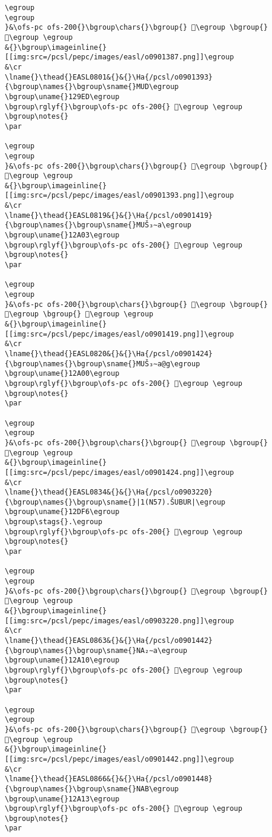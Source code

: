 \begin{verbatim}
\egroup
\egroup
}&\ofs-pc ofs-200{}\bgroup\chars{}\bgroup{} 𒧨\egroup \bgroup{} 𒧩\egroup \egroup
&{}\bgroup\imageinline{}[[img:src=/pcsl/pepc/images/easl/o0901387.png]]\egroup
&\cr
\lname{}\thead{}EASL0801&{}&{}\Ha{/pcsl/o0901393}{\bgroup\names{}\bgroup\sname{}MUD\egroup
\bgroup\uname{}129ED\egroup
\bgroup\rglyf{}\bgroup\ofs-pc ofs-200{} 𒧭\egroup \egroup
\bgroup\notes{}
\par 

\egroup
\egroup
}&\ofs-pc ofs-200{}\bgroup\chars{}\bgroup{} 𒧭\egroup \bgroup{} 𒧮\egroup \egroup
&{}\bgroup\imageinline{}[[img:src=/pcsl/pepc/images/easl/o0901393.png]]\egroup
&\cr
\lname{}\thead{}EASL0819&{}&{}\Ha{/pcsl/o0901419}{\bgroup\names{}\bgroup\sname{}MUŠ₃∼a\egroup
\bgroup\uname{}12A03\egroup
\bgroup\rglyf{}\bgroup\ofs-pc ofs-200{} 𒨃\egroup \egroup
\bgroup\notes{}
\par 

\egroup
\egroup
}&\ofs-pc ofs-200{}\bgroup\chars{}\bgroup{} 𒧿\egroup \bgroup{} 𒨂\egroup \bgroup{} 𒨃\egroup \egroup
&{}\bgroup\imageinline{}[[img:src=/pcsl/pepc/images/easl/o0901419.png]]\egroup
&\cr
\lname{}\thead{}EASL0820&{}&{}\Ha{/pcsl/o0901424}{\bgroup\names{}\bgroup\sname{}MUŠ₃∼a@g\egroup
\bgroup\uname{}12A00\egroup
\bgroup\rglyf{}\bgroup\ofs-pc ofs-200{} 𒨀\egroup \egroup
\bgroup\notes{}
\par 

\egroup
\egroup
}&\ofs-pc ofs-200{}\bgroup\chars{}\bgroup{} 𒨀\egroup \bgroup{} 𒨁\egroup \egroup
&{}\bgroup\imageinline{}[[img:src=/pcsl/pepc/images/easl/o0901424.png]]\egroup
&\cr
\lname{}\thead{}EASL0834&{}&{}\Ha{/pcsl/o0903220}{\bgroup\names{}\bgroup\sname{}|1(N57).ŠUBUR|\egroup
\bgroup\uname{}12DF6\egroup
\bgroup\stags{}.\egroup
\bgroup\rglyf{}\bgroup\ofs-pc ofs-200{} 𒷶\egroup \egroup
\bgroup\notes{}
\par 

\egroup
\egroup
}&\ofs-pc ofs-200{}\bgroup\chars{}\bgroup{} 𒷷\egroup \bgroup{} 𒷶\egroup \egroup
&{}\bgroup\imageinline{}[[img:src=/pcsl/pepc/images/easl/o0903220.png]]\egroup
&\cr
\lname{}\thead{}EASL0863&{}&{}\Ha{/pcsl/o0901442}{\bgroup\names{}\bgroup\sname{}NA₂∼a\egroup
\bgroup\uname{}12A10\egroup
\bgroup\rglyf{}\bgroup\ofs-pc ofs-200{} 𒨐\egroup \egroup
\bgroup\notes{}
\par 

\egroup
\egroup
}&\ofs-pc ofs-200{}\bgroup\chars{}\bgroup{} 𒨏\egroup \bgroup{} 𒨐\egroup \egroup
&{}\bgroup\imageinline{}[[img:src=/pcsl/pepc/images/easl/o0901442.png]]\egroup
&\cr
\lname{}\thead{}EASL0866&{}&{}\Ha{/pcsl/o0901448}{\bgroup\names{}\bgroup\sname{}NAB\egroup
\bgroup\uname{}12A13\egroup
\bgroup\rglyf{}\bgroup\ofs-pc ofs-200{} 𒨓\egroup \egroup
\bgroup\notes{}
\par 


\end{verbatim}
